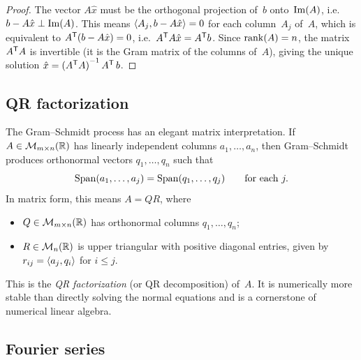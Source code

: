 \begin{proof}
The vector $A\hat{x}$ must be the orthogonal projection of~$b$
onto~$\operatorname{Im}(A)$, i.e.\ $b - A\hat{x}\perp\operatorname{Im}(A)$.  This means
$\langle A_j, b - A\hat{x}\rangle = 0$ for each column~$A_j$ of~$A$, which
is equivalent to ${A}^{\mathsf{T}}(b - A\hat{x}) = 0$, i.e.\
${A}^{\mathsf{T}}A\hat{x} = {A}^{\mathsf{T}}b$.  Since $\operatorname{rank}(A) = n$,
the matrix ${A}^{\mathsf{T}}A$ is invertible (it is the Gram matrix of
the columns of~$A$), giving the unique solution
$\hat{x} = {({A}^{\mathsf{T}}A)}^{-1}\,{A}^{\mathsf{T}}\, b$.
\end{proof}


\subsection{QR factorization}\label{subsec:QR}

The Gram--Schmidt process has an elegant matrix interpretation.  If
$A\in\mathcal{M}_{m\times n}({\mathbb{R}})$ has linearly independent columns
$a_1,\ldots,a_n$, then Gram--Schmidt produces orthonormal vectors
$q_1,\ldots,q_n$ such that
\[
  \operatorname{Span}(a_1,\ldots,a_j) = \operatorname{Span}(q_1,\ldots,q_j)
  \qquad\text{for each } j.
\]
In matrix form, this means $A = QR$, where
\begin{itemize}
  \item $Q\in\mathcal{M}_{m\times n}({\mathbb{R}})$ has orthonormal columns
    $q_1,\ldots,q_n$;
  \item $R\in\mathcal{M}_n({\mathbb{R}})$ is upper triangular with positive diagonal
    entries, given by $r_{ij} = \langle a_j,q_i\rangle$ for $i\leq j$.
\end{itemize}
This is the \emph{QR factorization} (or QR decomposition) of~$A$.  It
is numerically more stable than directly solving the normal equations and
is a cornerstone of numerical linear algebra.


\subsection{Fourier series}\label{subsec:fourier-preview}

